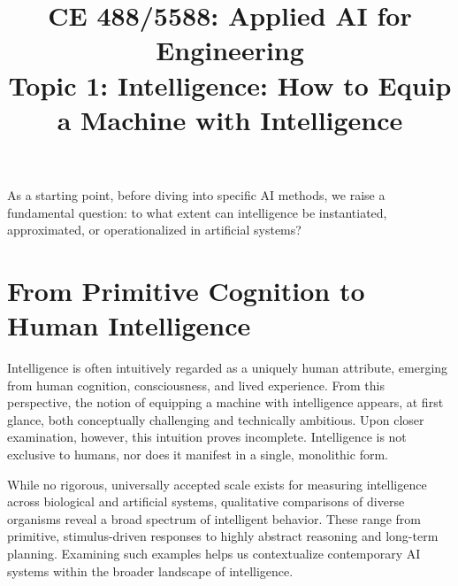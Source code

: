 \documentclass[12pt]{article}
\begin{document}
\doublespacing	

\title{CE 488/5588: Applied AI for Engineering\\ \large Topic 1: Intelligence: How to Equip a Machine with Intelligence}
\author{}
\date{}
\maketitle

\begin{ch-box}
As a starting point, before diving into specific AI methods, we raise a fundamental question: to what extent can intelligence be instantiated, approximated, or operationalized in artificial systems?
\end{ch-box}

\section{From Primitive Cognition to Human Intelligence}
Intelligence is often intuitively regarded as a uniquely human attribute, emerging from human cognition, consciousness, and lived experience. From this perspective, the notion of equipping a machine with intelligence appears, at first glance, both conceptually challenging and technically ambitious. Upon closer examination, however, this intuition proves incomplete. Intelligence is not exclusive to humans, nor does it manifest in a single, monolithic form.

While no rigorous, universally accepted scale exists for measuring intelligence across biological and artificial systems, qualitative comparisons of diverse organisms reveal a broad spectrum of intelligent behavior. These range from primitive, stimulus-driven responses to highly abstract reasoning and long-term planning. Examining such examples helps us contextualize contemporary AI systems within the broader landscape of intelligence.
\end{document}
